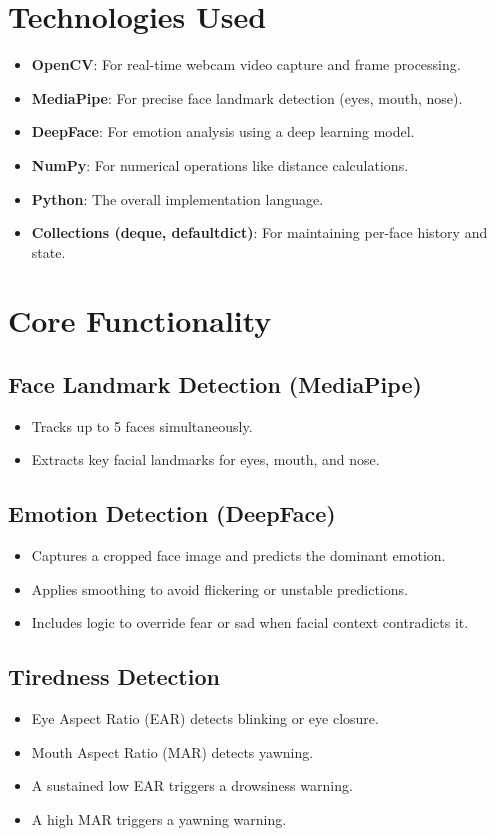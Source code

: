 \documentclass[12pt]{article}
\begin{document}
\section{Technologies Used}
\begin{itemize}
    \item \textbf{OpenCV}: For real-time webcam video capture and frame processing.
    \item \textbf{MediaPipe}: For precise face landmark detection (eyes, mouth, nose).
    \item \textbf{DeepFace}: For emotion analysis using a deep learning model.
    \item \textbf{NumPy}: For numerical operations like distance calculations.
    \item \textbf{Python}: The overall implementation language.
    \item \textbf{Collections (deque, defaultdict)}: For maintaining per-face history and state.
\end{itemize}

\section{Core Functionality}
\subsection{Face Landmark Detection (MediaPipe)}
\begin{itemize}
    \item Tracks up to 5 faces simultaneously.
    \item Extracts key facial landmarks for eyes, mouth, and nose.
\end{itemize}
\subsection{Emotion Detection (DeepFace)}
\begin{itemize}
    \item Captures a cropped face image and predicts the dominant emotion.
    \item Applies smoothing to avoid flickering or unstable predictions.
    \item Includes logic to override fear or sad when facial context contradicts it.
\end{itemize}
\subsection{Tiredness Detection}
\begin{itemize}
    \item Eye Aspect Ratio (EAR) detects blinking or eye closure.
    \item Mouth Aspect Ratio (MAR) detects yawning.
    \item A sustained low EAR triggers a drowsiness warning.
    \item A high MAR triggers a yawning warning.
\end{itemize}
\end{document}
